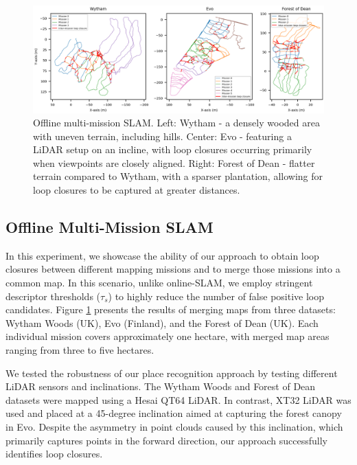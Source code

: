
\begin{figure}[t]
  \centering
  \includegraphics[width=0.99\linewidth]{pics/exp_3_1_multimission_slam}
  \caption{Offline multi-mission SLAM. Left: Wytham - a densely wooded area with uneven terrain, including hills. Center: Evo - featuring a LiDAR setup on an incline, with loop closures occurring primarily when viewpoints are closely aligned. Right: Forest of Dean - flatter terrain compared to Wytham, with a sparser plantation, allowing for loop closures to be captured at greater distances. 
}
  \label{fig:exp_multi_mission}
\end{figure}

\subsection{Offline Multi-Mission SLAM} 
\label{exp:offline_multi_mission}
In this experiment, we showcase the ability of our approach to obtain loop closures between different mapping missions and to merge those missions into a common map. In this scenario, unlike online-SLAM, we employ stringent descriptor thresholds ($\tau_{s}$) to highly reduce the number of false positive loop candidates. 
Figure \ref{fig:exp_multi_mission} presents the results of merging maps from three datasets: Wytham Woods (UK), Evo (Finland), and the Forest of Dean (UK). Each individual mission covers approximately one hectare, with merged map areas ranging from three to five hectares.

We tested the robustness of our place recognition approach by testing different LiDAR sensors and inclinations. The Wytham Woods and Forest of Dean datasets were mapped using a Hesai QT64 LiDAR. In contrast, XT32 LiDAR was used and placed at a 45-degree inclination aimed at capturing the forest canopy in Evo. Despite the asymmetry in point clouds caused by this inclination, which primarily captures points in the forward direction, our approach successfully identifies loop closures.


